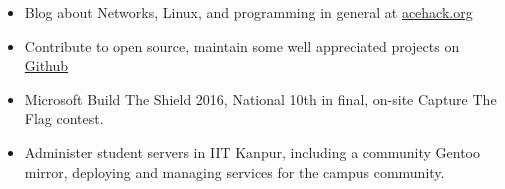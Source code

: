 
{\fontsize{11pt}{1em}\bodyfontlight\upshape\color{text}
\begin{itemize}
  \item Blog about Networks, Linux, and programming in
    general at \href{http://acehack.org}{acehack.org}
  \item Contribute to open source, maintain some well appreciated
    projects on \href{https://github.com/sakshamsharma}{Github}
  \item Microsoft Build The Shield 2016, National 10th in final,
    on-site Capture The Flag contest.
  \item Administer student servers in IIT Kanpur, including a community Gentoo
    mirror, deploying and managing services for the campus community.
\end{itemize}
}

